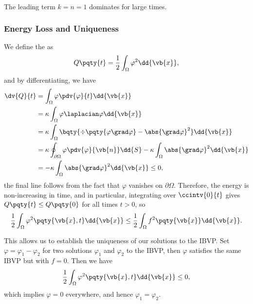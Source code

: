 {The leading term \(k = n = 1\) dominates for large times.

\subsubsection{Energy Loss and Uniqueness}

We define the  as
\begin{equation}
    Q\pqty{t} = \frac{1}{2} \int_{\Omega} \varphi^2 \dd{\vb{x}},
\end{equation}
and by differentiating, we have
\begin{subequations}
    \begin{align}
        \dv{Q}{t} &= \int_{\Omega} \varphi \pdv{\varphi}{t} \dd{\vb{x}} \\
        &= \kappa \int_{\Omega} \varphi \laplacian \varphi \dd{\vb{x}} \\
        &= \kappa \int_{\Omega} \bqty{\div \pqty{\varphi \grad \varphi} - \abs{\grad \varphi}^2} \dd{\vb{x}} \\
        &= \kappa \oint_{\partial \Omega} \varphi \pdv{\varphi}{\vb{n}} \dd{S} - \kappa \int_{\Omega} \abs{\grad \varphi}^2 \dd{\vb{x}} \\
        &= - \kappa \int_{\Omega} \abs{\grad \varphi}^2 \dd{\vb{x}} \leq 0,
    \end{align}
\end{subequations}
the final line follows from the fact that \(\varphi\) vanishes on \(\partial \Omega\). Therefore, the energy is non-increasing in time, and in particular, integrating over \(\ccintv{0}{t}\) gives \(Q\pqty{t} \leq Q\pqty{0}\) for all times \(t > 0\), so
\begin{equation}
    \frac{1}{2} \int_{\Omega} \varphi^2 \pqty{\vb{x}, t} \dd{\vb{x}} \leq \frac{1}{2} \int_{\Omega} f^2 \pqty{\vb{x}} \dd{\vb{x}}.
\end{equation}

This allows us to establish the uniqueness of our solutions to the IBVP. Set \(\varphi = \varphi_1 - \varphi_2\) for two solutions \(\varphi_1\) and \(\varphi_2\) to the IBVP, then \(\varphi\) satisfies the same IBVP but with \(f = 0\). Then we have
\begin{equation}
    \frac{1}{2} \int_{\Omega} \varphi^2 \pqty{\vb{x}, t} \dd{\vb{x}} \leq 0,
\end{equation}
which implies \(\varphi = 0\) everywhere, and hence \(\varphi_1 = \varphi_2\).

\small

}
